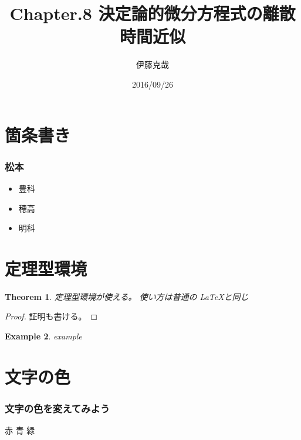 \documentclass[dvipdfmx,cjk]{beamer}
\newtheorem{thm}{Theorem}[section]
\theoremstyle{example}
\newtheorem{exam}[thm]{Example}
\begin{document}
\title[Chap8]{Chapter.8 決定論的微分方程式の離散時間近似} 
\author[Katsuya ITO]{伊藤克哉} 
\date{2016/09/26}
\begin{frame}                  %
\titlepage                     %
\end{frame}

\begin{frame}                  %
\tableofcontents
\end{frame}

\section{箇条書き}             %
\begin{frame}
\frametitle{松本}              %

\begin{itemize}
\item 豊科\pause               %
\item 穂高\pause
\item 明科
\end{itemize}
\end{frame}

\section{定理型環境}           %
\begin{frame}                  %
\begin{thm}
定理型環境が使える。
使い方は普通の \LaTeX と同じ
\end{thm}
\pause

\begin{proof}
証明も書ける。
\end{proof}
\pause

\begin{exam}                   %
example
\end{exam}
\end{frame}

\section{文字の色}             %
\begin{frame}
\frametitle{文字の色を変えてみよう}
{\color{red}赤}\pause
{\color{blue}青}\pause
{\color{green}緑}
\end{frame}
\end{document}
